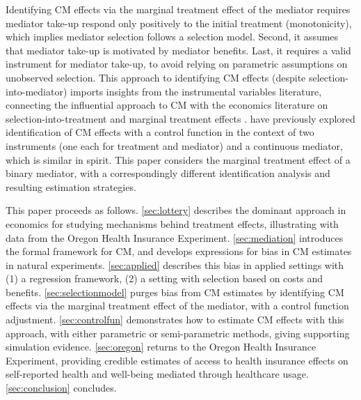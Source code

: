 Identifying CM effects via the marginal treatment effect of the mediator requires mediator take-up respond only positively to the initial treatment (monotonicity), which implies mediator selection follows a selection model.
Second, it assumes that mediator take-up is motivated by mediator benefits.
Last, it requires a valid instrument for mediator take-up, to avoid relying on parametric assumptions on unobserved selection.
This approach to identifying CM effects (despite selection-into-mediator) imports insights from the instrumental variables literature, connecting the influential \cite{imai2010identification} approach to CM with the economics literature on selection-into-treatment and marginal treatment effects \citep{vytlacil2002independence,heckman2004using,heckman2005structural,florens2008identification,kline2019heckits}.
\cite{frolich2017direct} have previously explored identification of CM effects with a control function in the context of two instruments (one each for treatment and mediator) and a continuous mediator, which is similar in spirit.
This paper considers the marginal treatment effect of a binary mediator, with a correspondingly different identification analysis and resulting estimation strategies.

This paper proceeds as follows.
\autoref{sec:lottery} describes the dominant approach in economics for studying mechanisms behind treatment effects, illustrating with data from the Oregon Health Insurance Experiment.
\autoref{sec:mediation} introduces the formal framework for CM, and develops expressions for bias in CM estimates in natural experiments.
\autoref{sec:applied} describes this bias in applied settings with (1) a regression framework, (2) a setting with selection based on costs and benefits.
\autoref{sec:selectionmodel} purges bias from CM estimates by identifying CM effects via the marginal treatment effect of the mediator, with a control function adjustment.
\autoref{sec:controlfun} demonstrates how to estimate CM effects with this approach, with either parametric or semi-parametric methods, giving supporting simulation evidence.
\autoref{sec:oregon} returns to the Oregon Health Insurance Experiment, providing credible estimates of access to health insurance effects on self-reported health and well-being mediated through healthcare usage.
\autoref{sec:conclusion} concludes.
